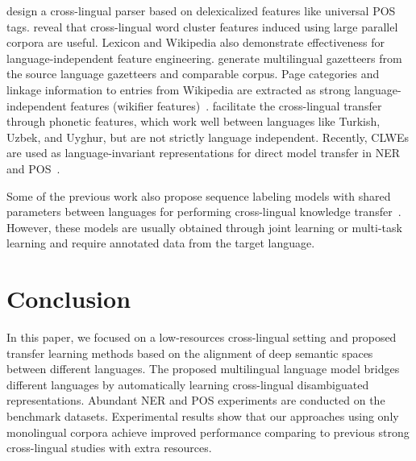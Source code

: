 \documentclass[11pt,a4paper]{article}
\begin{document}
	 design a cross-lingual parser based on delexicalized features like universal POS tags.  reveal that cross-lingual word cluster features induced using large parallel corpora are useful. Lexicon and Wikipedia also demonstrate effectiveness for language-independent feature engineering.   generate multilingual gazetteers from the source language gazetteers and comparable corpus. Page categories and linkage information to entries from Wikipedia are extracted as strong language-independent features (wikifier features)~\cite{tsai16cross}.  facilitate the cross-lingual transfer through phonetic features, which work well between languages like Turkish, Uzbek, and Uyghur, but are not strictly language independent. Recently, CLWEs are used as language-invariant representations for direct model transfer in NER~\cite{ni17weakly} and POS~\cite{fang2017model}.
	
	Some of the previous work also propose sequence labeling models with shared parameters between languages for performing cross-lingual knowledge transfer~\cite{lin18multi,cotterell17low,yang2017transfer,ammar16many,kim17cross}. However, these models are usually obtained through joint learning or multi-task learning and require annotated data from the target language.
	
	\section{Conclusion}
	In this paper, we focused on a low-resources cross-lingual setting and proposed transfer learning methods based on the alignment of deep semantic spaces between different languages. The proposed multilingual language model bridges different languages by automatically learning cross-lingual disambiguated representations. Abundant NER and POS experiments are conducted on the benchmark datasets. Experimental results show that our approaches using only monolingual corpora achieve improved performance comparing to previous strong cross-lingual studies with extra resources.
	
	
	
\end{document}

